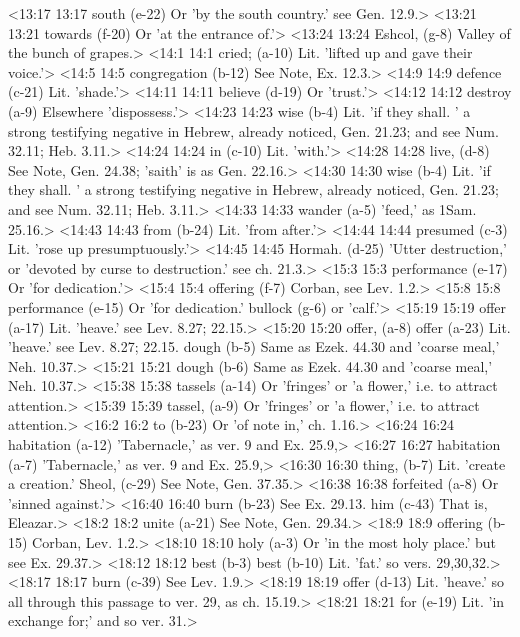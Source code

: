 <13:17 13:17  south (e-22)  Or 'by the south country.' see Gen. 12.9.>
<13:21 13:21  towards (f-20)  Or 'at the entrance of.'>
<13:24 13:24  Eshcol, (g-8)  Valley of the bunch of grapes.>
<14:1 14:1  cried; (a-10)  Lit. 'lifted up and gave their voice.'>
<14:5 14:5  congregation (b-12)  See Note, Ex. 12.3.>
<14:9 14:9  defence (c-21)  Lit. 'shade.'>
<14:11 14:11  believe (d-19)  Or 'trust.'>
<14:12 14:12  destroy (a-9)  Elsewhere 'dispossess.'>
<14:23 14:23  wise (b-4) Lit. 'if they shall. ' a strong testifying negative in Hebrew, already noticed, Gen. 21.23; and see Num. 32.11; Heb. 3.11.>
<14:24 14:24  in (c-10)  Lit. 'with.'>
<14:28 14:28  live, (d-8)  See Note, Gen. 24.38; 'saith' is as Gen. 22.16.>
<14:30 14:30  wise (b-4)  Lit. 'if they shall. ' a strong testifying negative in  Hebrew, already noticed, Gen. 21.23; and see Num. 32.11; Heb.  3.11.>
<14:33 14:33  wander (a-5)  'feed,' as 1Sam. 25.16.>
<14:43 14:43  from (b-24)  Lit. 'from after.'>
<14:44 14:44  presumed (c-3)  Lit. 'rose up presumptuously.'>
<14:45 14:45  Hormah. (d-25)  'Utter destruction,' or 'devoted by curse to destruction.'  see ch. 21.3.>
<15:3 15:3  performance (e-17) Or 'for dedication.'>
<15:4 15:4  offering (f-7)  Corban, see Lev. 1.2.>
<15:8 15:8  performance (e-15)  Or 'for dedication.'
  bullock (g-6)  or 'calf.'>
<15:19 15:19  offer (a-17) Lit. 'heave.' see Lev. 8.27; 22.15.>
<15:20 15:20  offer, (a-8)  offer (a-23)
  Lit. 'heave.' see Lev. 8.27; 22.15.
  dough (b-5) Same as Ezek. 44.30 and 'coarse meal,' Neh. 10.37.>
<15:21 15:21  dough (b-6)  Same as Ezek. 44.30 and 'coarse meal,' Neh. 10.37.>
<15:38 15:38  tassels (a-14) Or 'fringes' or 'a flower,' i.e. to attract attention.>
<15:39 15:39  tassel, (a-9)  Or 'fringes' or 'a flower,' i.e. to attract attention.>
<16:2 16:2  to (b-23)  Or 'of note in,' ch. 1.16.>
<16:24 16:24  habitation (a-12) 'Tabernacle,' as ver. 9 and Ex. 25.9,>
<16:27 16:27  habitation (a-7)  'Tabernacle,' as ver. 9 and Ex. 25.9,>
<16:30 16:30  thing, (b-7)  Lit. 'create a creation.'
  Sheol, (c-29)  See Note, Gen. 37.35.>
<16:38 16:38  forfeited (a-8)  Or 'sinned against.'>
<16:40 16:40  burn (b-23)  See Ex. 29.13.
  him (c-43)  That is, Eleazar.>
<18:2 18:2  unite (a-21)  See Note, Gen. 29.34.>
<18:9 18:9  offering (b-15)  Corban, Lev. 1.2.>
<18:10 18:10  holy (a-3)  Or 'in the most holy place.' but see Ex. 29.37.>
<18:12 18:12  best (b-3)  best (b-10)
  Lit. 'fat.' so vers. 29,30,32.>
<18:17 18:17  burn (c-39)  See Lev. 1.9.>
<18:19 18:19  offer (d-13)  Lit. 'heave.' so all through this passage to ver. 29, as ch. 15.19.>
<18:21 18:21  for (e-19)  Lit. 'in exchange for;' and so ver. 31.>
